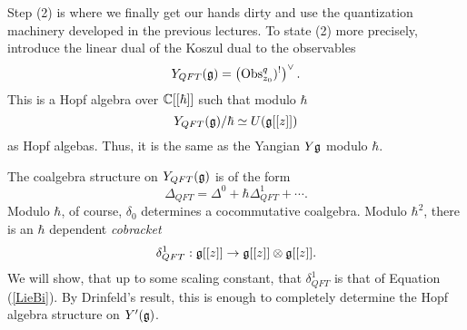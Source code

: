 \documentclass[11pt]{amsart}
\begin{document}
Step (2) is where we finally get our hands dirty and use the quantization machinery developed in the previous lectures. 
To state (2) more precisely, introduce the linear dual of the Koszul dual to the observables
\[
Y_{QFT}(\mathfrak g) = \left({\rm Obs}^q_{z_0})^{!}\right)^\vee .
\] 
This is a Hopf algebra over $\mathbb C[[\hbar]]$ such that modulo $\hbar$ 
\[
Y_{QFT} (\mathfrak g) / \hbar \simeq U(\mathfrak g[[z]])
\]
as Hopf algebas. 
Thus, it is the same as the Yangian $Y\mathfrak g$ modulo $\hbar$. 

The coalgebra structure on $Y_{QFT}(\mathfrak g)$ is of the form
\[
\Delta_{QFT} = \Delta^0 + \hbar \Delta_{QFT}^1 + \cdots  .
\]
Modulo $\hbar$, of course, $\delta_0$ determines a cocommutative coalgebra. 
Modulo $\hbar^2$, there is an $\hbar$ dependent {\em cobracket}
\[
\delta_{QFT}^1 : \mathfrak g[[z]] \to \mathfrak g[[z]] \otimes \mathfrak g[[z]] .
\]
We will show, that up to some scaling constant, that $\delta_{QFT}^1$ is that of Equation (\ref{LieBi}). 
By Drinfeld's result, this is enough to completely determine the Hopf algebra structure on $Y'(\mathfrak g)$. 

%


%  

\end{document}
